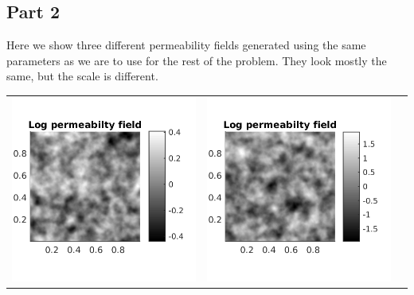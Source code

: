 \documentclass{article}
\begin{document}
\subsection{Part 2}
Here we show three different permeability fields generated using the same parameters as we are to use for the rest of the problem.
They look mostly the same, but the scale is different.
\begin{table}[!h]
\centering
\begin{tabular}{c c c}
\includegraphics[scale=0.75]{figs/kfield_01_0025_0025.png} &
\includegraphics[scale=0.75]{figs/kfield_2_0025_0025.png} &

\end{tabular}
\end{table}
\end{document}
